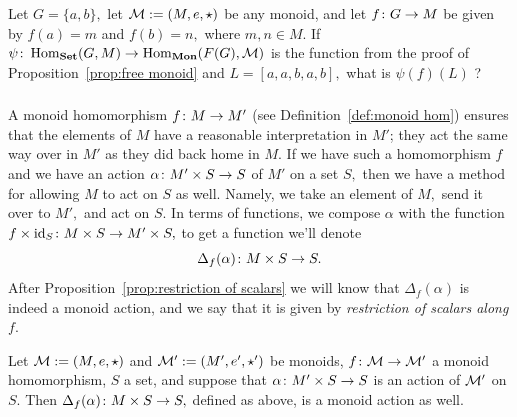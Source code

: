 \documentclass[CT4S-EN-RU]{subfiles}
\begin{document}
\begin{proofRUS}
\end{proofRUS}

\begin{exerciseENG}
Let $G=\{a,b\},$ let $\mathcal{M}:=(M,e,\star)$ be any monoid, and let $f\colon G\rightarrow M$ be given by $f(a)=m$ and $f(b)=n,$ where $m,n\in M.$ If $\psi\colon\operatorname{Hom}_{\mathbf{Set}}(G,M)\rightarrow\operatorname{Hom}_{\mathbf{Mon}}(F(G),\mathcal{M})$ is the function from the proof of Proposition~\ref{prop:free monoid} and $L=[a,a,b,a,b],$ what is $\psi(f)(L)$ ?
\end{exerciseENG}

\begin{exerciseRUS}
\end{exerciseRUS}


\subsubsection{}

\begin{blockENG}
A monoid homomorphism $f\colon M\rightarrow M'$ (see Definition~\ref{def:monoid hom}) ensures that the elements of $M$ have a reasonable interpretation in $M'$; they act the same way over in $M'$ as they did back home in $M.$ If we have such a homomorphism $f$ and we have an action $\alpha\colon M'\times S\rightarrow S$ of $M'$ on a set $S,$ then we have a method for allowing $M$ to act on $S$ as well. Namely, we take an element of $M,$ send it over to $M',$ and act on $S.$ In terms of functions, we compose $\alpha$ with the function $f\times\operatorname{id}_S\colon M\times S\rightarrow M'\times S,$ to get a function we'll denote $$\Delta_f(\alpha)\colon M\times S\rightarrow S.$$ After Proposition~\ref{prop:restriction of scalars} we will know that $\Delta_f(\alpha)$ is indeed a monoid action, and we say that it is given by {\em restriction of scalars along $f$}.
\end{blockENG}

\begin{blockRUS}
\end{blockRUS}

\begin{propositionENG}\label{prop:restriction of scalars}
Let $\mathcal{M}:=(M,e,\star)$ and $\mathcal{M}':=(M',e',\star')$ be monoids, $f\colon\mathcal{M}\rightarrow\mathcal{M}'$ a monoid homomorphism, $S$ a set, and suppose that $\alpha\colon M'\times S\rightarrow S$ is an action of $\mathcal{M}'$ on $S.$ Then $\Delta_f(\alpha)\colon M\times S\rightarrow S,$ defined as above, is a monoid action as well.
\end{propositionENG}
\end{document}
